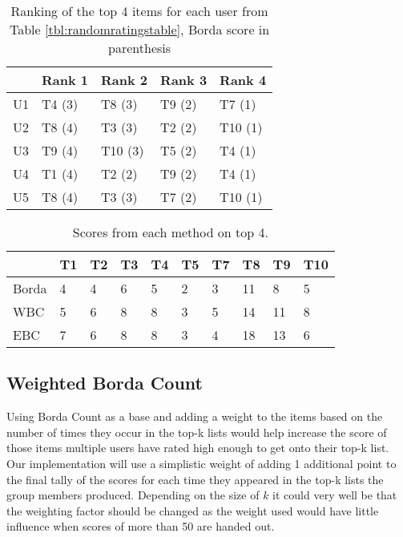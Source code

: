 \begin{table}[H]
	\centering
	\begin{tabular}{l|l|l|l|l|}
		\cline{2-5}
		& Rank 1 & Rank 2 & Rank 3 & Rank 4 \\ \hline
		\multicolumn{1}{|l|}{U1} & T4 (3) & T8 (3) & T9 (2) & T7 (1) \\ \hline
		\multicolumn{1}{|l|}{U2} & T8 (4) & T3 (3) & T2 (2) & T10 (1) \\ \hline
		\multicolumn{1}{|l|}{U3} & T9 (4) & T10 (3) & T5 (2) & T4 (1) \\ \hline
		\multicolumn{1}{|l|}{U4} & T1 (4) & T2 (2) & T9 (2) & T4 (1) \\ \hline
		\multicolumn{1}{|l|}{U5} & T8 (4) & T3 (3) & T7 (2) & T10 (1) \\ \hline
	\end{tabular}
	\caption{Ranking of the top 4 items for each user from Table \ref{tbl:randomratingstable}, Borda score in parenthesis }
	\label{tbl:top4borda}
\end{table}

\begin{table}[H]
	\centering
	\begin{tabular}{l|l|l|l|l|l|l|l|l|l|}
		\cline{2-10}
		& T1 & T2 & T3 & T4 & T5 & T7 & T8 & T9 & T10 \\ \hline
		\multicolumn{1}{|l|}{Borda} & 4 & 4 & 6 & 5 & 2 & 3 & 11 & 8 & 5 \\ \hline
		\multicolumn{1}{|l|}{WBC} & 5 & 6 & 8 & 8 & 3 & 5 & 14 & 11 & 8 \\ \hline
		\multicolumn{1}{|l|}{EBC} & 7 & 6 & 8 & 8 & 3 & 4 & 18 & 13 & 6 \\ \hline
	\end{tabular}
	\caption{Scores from each method on top 4.}
	\label{tbl:novelscoresexample}
\end{table}

\subsection{Weighted Borda Count}
Using Borda Count as a base and adding a weight to the items based on the number of times they occur in the top-k lists would help increase the score of those items multiple users have rated high enough to get onto their top-k list. Our implementation will use a simplistic weight of adding 1 additional point to the final tally of the scores for each time they appeared in the top-k lists the group members produced. Depending on the size of $k$ it could very well be that the weighting factor should be changed as the weight used would have little influence when scores of more than 50 are handed out.


